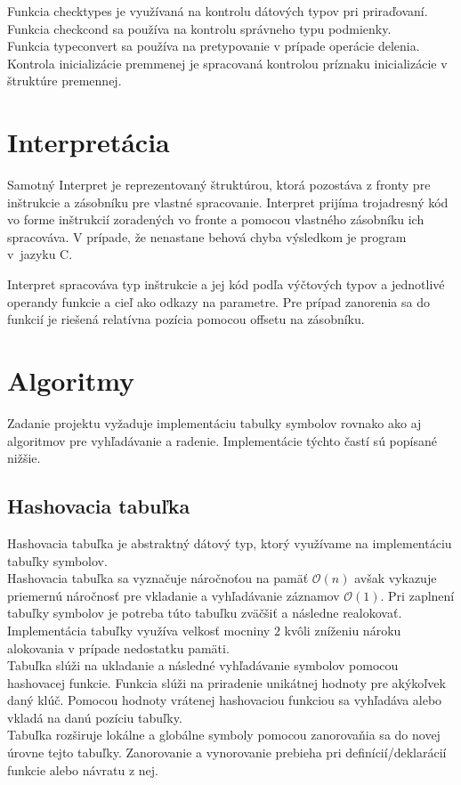 \documentclass[a4paper]{article}
\begin{document}
Funkcia checktypes je využívaná na kontrolu dátových typov pri priraďovaní.\\
Funkcia checkcond sa používa na kontrolu správneho typu podmienky.\\
Funkcia typeconvert sa používa na pretypovanie v prípade operácie delenia.\\
Kontrola inicializácie premmenej je spracovaná kontrolou príznaku inicializácie v štruktúre premennej.


\section{Interpretácia}
Samotný Interpret je reprezentovaný štruktúrou, ktorá pozostáva z fronty pre inštrukcie a zásobníku pre vlastné spracovanie. Interpret prijíma trojadresný kód vo forme inštrukcií zoradených vo fronte a pomocou vlastného zásobníku ich spracováva. V prípade, že nenastane behová chyba výsledkom je program v~jazyku C.

Interpret spracováva typ inštrukcie a jej kód podľa výčtových typov a jednotlivé operandy funkcie a cieľ ako odkazy na parametre. Pre prípad zanorenia sa do funkcií je riešená relatívna pozícia pomocou offsetu na zásobníku.

\section{Algoritmy}
Zadanie projektu vyžaduje implementáciu tabulky symbolov rovnako ako aj algoritmov pre vyhľadávanie a radenie. Implementácie týchto častí sú popísané nižšie. 

\subsection{Hashovacia tabuľka}
Hashovacia tabuľka je abstraktný dátový typ, ktorý využívame na implementáciu tabuľky symbolov. \\
Hashovacia tabuľka sa vyznačuje náročnoťou na pamäť $\mathcal{O}(n)$ avšak vykazuje priemernú náročnosť pre vkladanie a vyhľadávanie záznamov $\mathcal{O}(1)$. Pri zaplnení tabuľky symbolov je potreba túto tabuľku zväčšiť a následne realokovať. Implementácia tabuľky využíva velkosť mocniny $2$ kvôli zníženiu nároku alokovania v prípade nedostatku pamäti.\\
Tabuľka slúži na ukladanie a následné vyhľadávanie symbolov pomocou hashovacej funkcie. Funkcia slúži na priradenie unikátnej hodnoty pre akýkoľvek daný klúč. Pomocou hodnoty vrátenej hashovaciou funkciou sa vyhľadáva alebo vkladá na danú pozíciu tabuľky.\\ 
Tabuľka rozširuje lokálne a globálne symboly pomocou zanorovaňia sa do novej úrovne tejto tabuľky. Zanorovanie a vynorovanie prebieha pri definícií/deklarácií funkcie alebo návratu z nej. 
\end{document}
